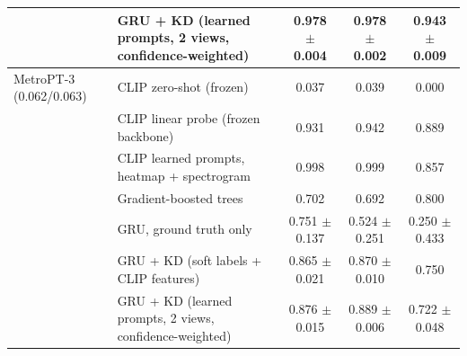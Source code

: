 \begin{tabular}{llccc}
 & GRU + KD (learned prompts, 2 views, confidence-weighted) & 0.978 $\pm$ 0.004 & 0.978 $\pm$ 0.002 & 0.943 $\pm$ 0.009 \\
\midrule
MetroPT-3 (0.062/0.063) & CLIP zero-shot (frozen) & 0.037 & 0.039 & 0.000 \\
 & CLIP linear probe (frozen backbone) & 0.931 & 0.942 & 0.889 \\
 & CLIP learned prompts, heatmap + spectrogram & 0.998 & 0.999 & 0.857 \\
 & Gradient-boosted trees & 0.702 & 0.692 & 0.800 \\
 & GRU, ground truth only & 0.751 $\pm$ 0.137 & 0.524 $\pm$ 0.251 & 0.250 $\pm$ 0.433 \\
 & GRU + KD (soft labels + CLIP features) & 0.865 $\pm$ 0.021 & 0.870 $\pm$ 0.010 & 0.750 \\
 & GRU + KD (learned prompts, 2 views, confidence-weighted) & 0.876 $\pm$ 0.015 & 0.889 $\pm$ 0.006 & 0.722 $\pm$ 0.048 \\
\bottomrule
\end{tabular}